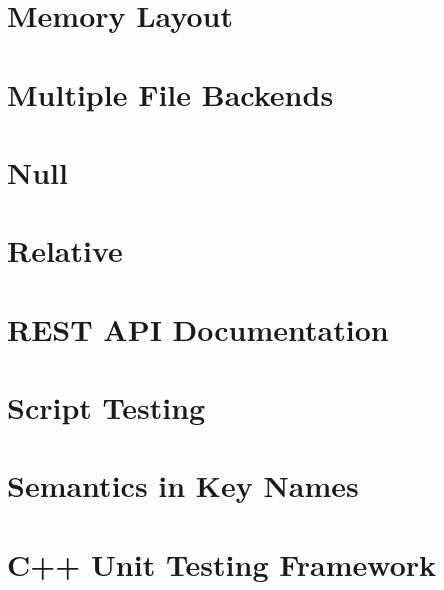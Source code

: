 \let\mypdfximage\pdfximage\def\pdfximage{\immediate\mypdfximage}\documentclass[twoside]{book}
\newcommand{\+}{\discretionary{\mbox{\scriptsize$\hookleftarrow$}}{}{}}
\begin{document}
\chapter{Memory Layout}
\label{doc_decisions_6_implemented_memory_layout_md}

\chapter{Multiple File Backends}
\label{doc_decisions_6_implemented_multiple_file_backends_md}

\chapter{Null}
\label{doc_decisions_6_implemented_null_md}

\chapter{Relative}
\label{doc_decisions_6_implemented_relative_md}

\chapter{REST API Documentation}
\label{doc_decisions_6_implemented_rest_api_documentation_md}

\chapter{Script Testing}
\label{doc_decisions_6_implemented_script_testing_md}

\chapter{Semantics in Key Names}
\label{doc_decisions_6_implemented_semantics_name_md}

\chapter{C++ Unit Testing Framework}
\label{doc_decisions_6_implemented_unit_testing_md}

\end{document}
